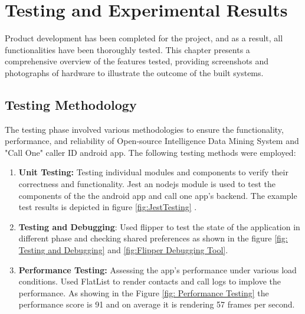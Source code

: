 \chapter{Testing and Experimental Results}
\justify

Product development has been completed for the project, and as a result, all functionalities have been thoroughly tested. This chapter presents a comprehensive overview of the features tested, providing screenshots and photographs of hardware to illustrate the outcome of the built systems.

\section{Testing Methodology}

The testing phase involved various methodologies to ensure the functionality, performance, and reliability of Open-source Intelligence Data Mining System and  "Call One" caller ID  android app. The following testing methods were employed:

\begin{enumerate}[label=\roman*.]
    \item \textbf{Unit Testing:} Testing individual modules and components to verify their correctness and functionality. Jest an nodejs module is used to test the components of the the android app and call one app's backend. The example test results is depicted in figure \ref{fig:JestTesting} .

    \item \textbf{Testing and Debugging}: Used flipper to test the state of the application in different phase and checking shared preferences as shown in the figure \ref{fig: Testing and Debugging} and \ref{fig:Flipper Debugging Tool}.
 
    \item \textbf{Performance Testing:} Assessing the app's performance under various load conditions. Used FlatList to render contacts and call logs to implove the performance. As showing in the Figure \ref{fig: Performance Testing} the performance score is 91 and on average it is rendering 57 frames per second.

\end{enumerate}

